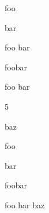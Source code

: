 
\def\mytitle{Abbreviations}






\gls{foo}

\gls{bar}

\gls{foo} \gls{bar}

\gls{foobar}

\gls{foo bar}

5

\gls{baz}

\gls{foo}

\gls{bar}

\gls{foobar}

\gls{foo bar} baz



